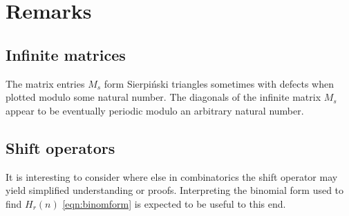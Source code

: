 \documentclass[12pt,reqno]{article}
\begin{document}
\section{Remarks}

\subsection{Infinite matrices}
\begin{remark}
	The matrix entries $M_{s}$ form Sierpi\'nski triangles sometimes with defects when plotted modulo some natural number. The diagonals of the infinite matrix $M_{s}$ appear to be eventually periodic modulo an arbitrary natural number.
\end{remark}
\subsection{Shift operators}
\begin{remark}
	It is interesting to consider where else in combinatorics the shift operator may yield simplified understanding or proofs. Interpreting the binomial form used to find $H_{r}(n)$ \eqref{eqn:binomform} is expected to be useful to this end.

\end{remark}
\end{document}
